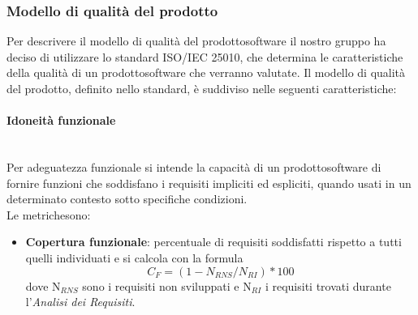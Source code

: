 \subsubsection{Modello di qualità del prodotto} 
Per descrivere il modello di qualità del prodotto\glosp software il nostro gruppo ha deciso di utilizzare lo standard ISO/IEC 25010, che determina le caratteristiche della qualità di un prodotto\glosp software che verranno valutate. Il modello di qualità del prodotto\glo, definito nello standard, è suddiviso nelle seguenti caratteristiche:
	\paragraph{Idoneità funzionale} \mbox{}\\[1mm]
	Per adeguatezza funzionale si intende la capacità di un prodotto\glosp software di fornire funzioni che soddisfano i requisiti impliciti ed espliciti, quando usati in un determinato contesto sotto specifiche condizioni. \\
	Le metriche\glosp sono:
	\begin{itemize}
		\item \textbf{Copertura funzionale}: percentuale di requisiti soddisfatti rispetto a tutti quelli individuati e si calcola con la formula
		\[C_F=(1-N_{RNS}/N_{RI})*100\]
		dove N$_{RNS}$ sono i requisiti non sviluppati e N$_{RI}$ i requisiti trovati durante l'\textit{Analisi dei Requisiti}.
	\end{itemize}
